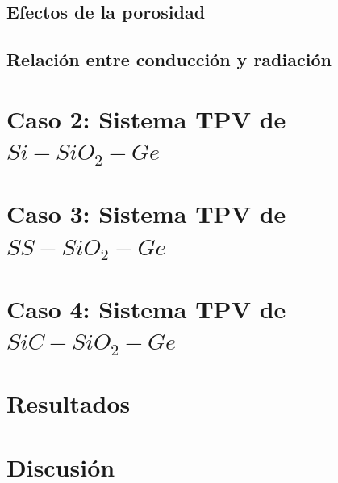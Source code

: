 \subsection{Efectos de la porosidad}

\subsection{Relación entre conducción y radiación}

\section{Caso 2: Sistema TPV de $Si-SiO_2-Ge$}

\section{Caso 3: Sistema TPV de $SS-SiO_2-Ge$}

\section{Caso 4: Sistema TPV de $SiC-SiO_2-Ge$}

\section{Resultados}


\section{Discusión}